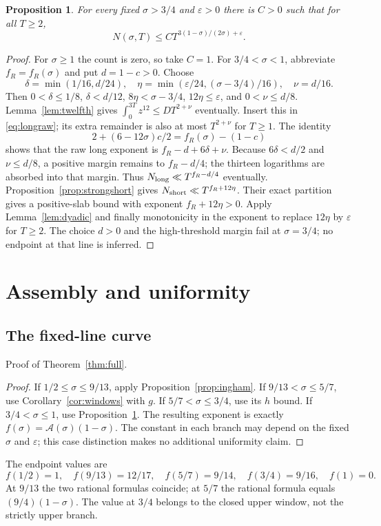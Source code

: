 \documentclass[11pt,a4paper,oneside]{article}
\newtheorem{proposition}[theorem]{Proposition}
\theoremstyle{definition}
\newcommand{\eps}{\varepsilon}
\numberwithin{equation}{section}
\begin{document}
\begin{proposition}\label{prop:strong}
For every fixed $\sigma>3/4$ and $\eps>0$ there is $C>0$ such that
for all $T\ge2$,
\[
 N(\sigma,T)\le CT^{3(1-\sigma)/(2\sigma)+\eps}.
\]
\end{proposition}
\begin{proof}
For $\sigma\ge1$ the count is zero, so take $C=1$.
For $3/4<\sigma<1$, abbreviate $f_R=f_R(\sigma)$ and put $d=1-c>0$. Choose
\[
 \delta=\min(1/16,d/24),\quad
 \eta=\min(\eps/24,(\sigma-3/4)/16),\quad\nu=d/16.
\]
Then $0<\delta\le1/8$, $\delta<d/12$, $8\eta<\sigma-3/4$,
$12\eta\le\eps$, and $0<\nu\le d/8$.
Lemma~\ref{lem:twelfth} gives $\int_0^{3T}z^{12}\le DT^{2+\nu}$
eventually. Insert this in \eqref{eq:longraw}; its extra remainder is
also at most $T^{2+\nu}$ for $T\ge1$.
The identity
\[
 2+(6-12\sigma)c/2=f_R(\sigma)-(1-c)
\]
shows that the raw long exponent is $f_R-d+6\delta+\nu$.
Because $6\delta<d/2$ and $\nu\le d/8$, a positive margin remains to
$f_R-d/4$; the thirteen logarithms are absorbed into that margin.
Thus $N_{\rm long}\ll T^{f_R-d/4}$ eventually.
Proposition~\ref{prop:strongshort} gives
$N_{\rm short}\ll T^{f_R+12\eta}$. Their exact partition gives a
positive-slab bound with exponent $f_R+12\eta>0$.
Apply Lemma~\ref{lem:dyadic} and finally monotonicity in the exponent to
replace $12\eta$ by $\eps$ for $T\ge2$.
The choice $d>0$ and the high-threshold margin fail at $\sigma=3/4$;
no endpoint at that line is inferred.
\end{proof}
\section{Assembly and uniformity}\label{ch:final}
\subsection{The fixed-line curve}
Proof of Theorem~\ref{thm:full}.
\begin{proof}
If $1/2\le\sigma\le9/13$, apply Proposition~\ref{prop:ingham}.
If $9/13<\sigma\le5/7$, use Corollary~\ref{cor:windows} with $g$.
If $5/7<\sigma\le3/4$, use its $h$ bound.
If $3/4<\sigma\le1$, use Proposition~\ref{prop:strong}.
The resulting exponent is exactly $f(\sigma)=\mathcal A(\sigma)(1-\sigma)$.
The constant in each branch may depend on the fixed $\sigma$ and $\eps$;
this case distinction makes no additional uniformity claim.
\end{proof}
The endpoint values are
\[
 f(1/2)=1,\quad f(9/13)=12/17,\quad f(5/7)=9/14,
 \quad f(3/4)=9/16,\quad f(1)=0.
\]
At $9/13$ the two rational formulas coincide; at $5/7$ the rational
formula equals $(9/4)(1-\sigma)$. The value at $3/4$ belongs to the
closed upper window, not the strictly upper branch.
\end{document}
